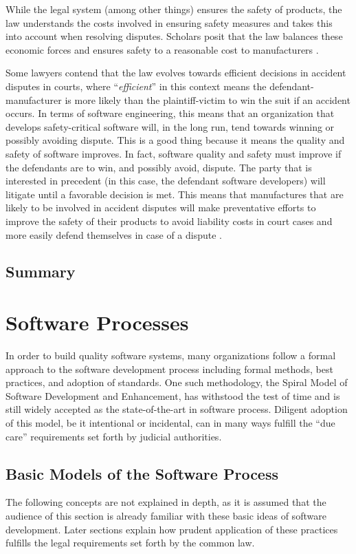\documentclass[12pt]{report}
\begin{document}
While the legal system (among other things) ensures the safety of products, the law understands the costs involved in ensuring safety measures and takes this into account when resolving disputes. Scholars posit that the law balances these economic forces and ensures safety to a reasonable cost to manufacturers \cite{FAKE}. 

Some lawyers contend that the law evolves towards efficient decisions in accident disputes in courts, where ``\textit{efficient}'' in this context means the defendant-manufacturer is more likely than the plaintiff-victim to win the suit if an accident occurs. In terms of software engineering, this means that an organization that develops safety-critical software will, in the long run, tend towards winning or possibly avoiding dispute. This is a good thing because it means the quality and safety of software improves. In fact, software quality and safety must improve if the defendants are to win, and possibly avoid, dispute. The party that is interested in precedent (in this case, the defendant software developers) will litigate until a favorable decision is met. This means that manufactures that are likely to be involved in accident disputes will make preventative efforts to improve the safety of their products to avoid liability costs in court cases and more easily defend themselves in case of a dispute \cite{FAKE}. 

\section{Summary} 

\chapter{Software Processes}\label{software_process}
In order to build quality software systems, many organizations follow a formal approach to the software development process including formal methods, best practices, and adoption of standards. One such methodology, the Spiral Model of Software Development and Enhancement, has withstood the test of time and is still widely accepted as the state-of-the-art in software process. Diligent adoption of this model, be it intentional or incidental, can in many ways fulfill the ``due care'' requirements set forth by judicial authorities.  

\section{Basic Models of the Software Process}  
The following concepts are not explained in depth, as it is assumed that the audience of this section is already familiar with these basic ideas of software development. Later sections explain how prudent application of these practices fulfills the legal requirements set forth by the common law.  
\end{document}

